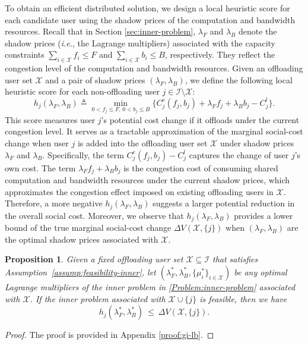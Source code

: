 \documentclass[lettersize,journal]{IEEEtran}
\newtheorem{proposition}{Proposition}
\newcommand{\ie}{\emph{i.e.}}
\begin{document}
To obtain an efficient distributed solution, we design a local heuristic score for each candidate user using the shadow prices of the computation and bandwidth resources. 
Recall that in Section \ref{sec:inner-problem}, $\lambda_F$ and $\lambda_B$ denote the shadow prices (\ie, the Lagrange multipliers) associated with the capacity constraints $\sum_{i\in \mathcal{X}} f_i \le F$ and $\sum_{i\in \mathcal{X}} b_i \le B$, respectively. 
They reflect the congestion level of the computation and bandwidth resources.
Given an offloading user set $\mathcal{X}$ and a pair of shadow prices $(\lambda_F,\lambda_B)$, we define the following local heuristic score for each non-offloading user $j\in \mathcal{I}\setminus \mathcal{X}$: 
\begin{equation}
\label{eq:local-h-score}
h_j(\lambda_F,\lambda_B)
\triangleq
\min_{0<f_j\le F,\,0<b_j\le B}
\Big\{ C_j^e(f_j,b_j) + \lambda_F f_j + \lambda_B b_j-C^l_j \Big\}.
\end{equation}
This score measures user $j$'s potential cost change if it offloads under the current congestion level. It serves as a tractable approximation of the marginal social-cost change when user $j$ is added into the offloading user set $\mathcal{X}$ under shadow prices $\lambda_F$ and $\lambda_B$. Specifically, the term $C_j^e(f_j,b_j)-C^l_j$ captures the change of user $j$'s own cost. The term $\lambda_F f_j + \lambda_B b_j$ is the congestion cost of consuming shared computation and bandwidth resources under the current shadow prices, which approximates the congestion effect imposed on existing offloading users in $\mathcal{X}$. Therefore, a more negative $h_j(\lambda_F,\lambda_B)$ suggests a larger potential reduction in the overall social cost.
Moreover, we observe that $h_j(\lambda_F,\lambda_B)$ provides a lower bound of the true marginal social-cost change $\Delta V(\mathcal{X},\{j\})$ when $(\lambda_F,\lambda_B)$ are the optimal shadow prices associated with $\mathcal{X}$.

\begin{proposition}
\label{prop:gi-lower-bound}
Given a fixed offloading user set $\mathcal{X}\subseteq\mathcal{I}$ that satisfies Assumption~\ref{assump:feasibility-inner}, 
let $(\lambda_F^*,\lambda_B^*,\{\mu_i^*\}_{i\in\mathcal{X}})$ be any optimal Lagrange multipliers of the inner problem in \eqref{Problem:inner-problem} associated with $\mathcal{X}$.
If the inner problem associated with $\mathcal{X}\cup\{j\}$ is feasible, then we have
\begin{equation}
h_j(\lambda_F^*,\lambda_B^*)\ \le\ \Delta V(\mathcal{X},\{j\}).
\label{eq:gi-lb}
\end{equation}
\end{proposition}
\begin{proof}
    The proof is provided in Appendix \ref{proof:gi-lb}.
\end{proof}
\end{document}
